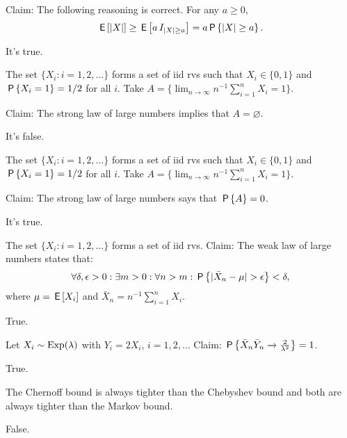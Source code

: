 \documentclass[tf-tutorial-all.tex]{subfiles}
\begin{document}
\begin{truefalse}
Claim: The following reasoning is correct. For any $a\geq 0$,
\begin{equation}
\label{eq:8}
\E{|X|} \geq \E{a \1{|X|\geq a}} = a \P{|X| \geq a}.
\end{equation}

\begin{solution}
It's true.
\end{solution}
\end{truefalse}

\begin{truefalse}
The set $\{X_i : i = 1, 2, \ldots\}$ forms a set of iid rvs such that $X_i\in \{0, 1\}$ and $\P{X_i=1} = 1/2$ for all $i$.
Take $A=\{\lim_{n\to\infty} n^{-1}\sum_{i=1}^{n}X_i = 1\}$.

Claim: The strong law of large numbers implies that $A=\varnothing$.

\begin{solution}
It's false.
\end{solution}
\end{truefalse}

\begin{truefalse}
The set $\{X_i : i = 1, 2, \ldots\}$ forms a set of iid rvs such that $X_i\in \{0, 1\}$ and $\P{X_i=1} = 1/2$ for all $i$.
Take $A=\{\lim_{n\to\infty} n^{-1}\sum_{i=1}^{n}X_i = 1\}$.

Claim: The strong law of large numbers says that $\P{A} = 0$.

\begin{solution}
It's true.
\end{solution}
\end{truefalse}

\begin{truefalse}
The set $\{X_i : i = 1, 2, \ldots\}$ forms a set of iid rvs.
Claim: The weak law of large numbers states that:
\begin{equation}
\label{eq:9}
\forall \delta, \epsilon > 0: \exists m > 0 : \forall n > m: \P{|\bar X_{n}-\mu| > \epsilon} < \delta,
\end{equation}
where $\mu=\E{X_{i}}$ and $\bar X_n = n^{-1}\sum_{i=1}^{n}X_{i}$.
\begin{solution}
True.
\end{solution}
\end{truefalse}

\begin{truefalse}
Let $X_i \sim \Exp{\lambda}$ with $Y_i = 2X_i$, $i=1,2,\dots$ Claim: $\P{\bar{X}_n\bar{Y}_n \xrightarrow{} \frac{2}{\lambda^2}}=1$.

\begin{solution}
True.
\end{solution}
\end{truefalse}


\begin{truefalse}
The Chernoff bound is always tighter than the Chebyshev bound and both are always tighter than the Markov bound.
\begin{solution}
False.
\end{solution}
\end{truefalse}
\end{document}

